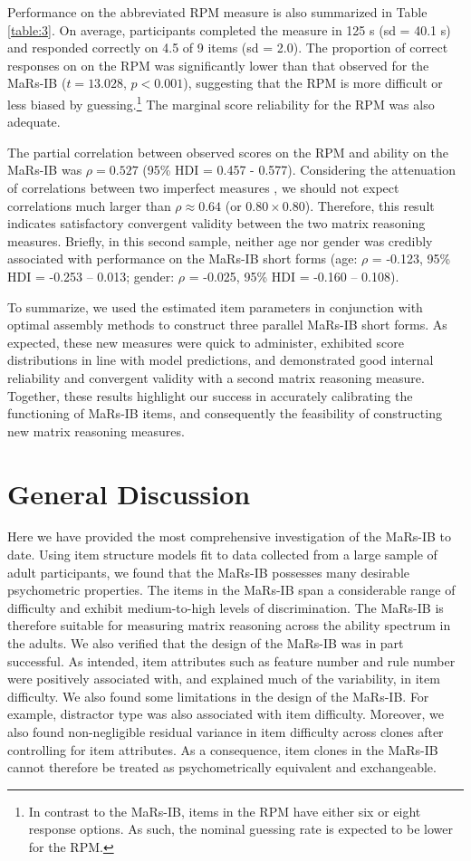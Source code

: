 \documentclass[a4paper,man,natbib]{apa6}
\begin{document}
Performance on the abbreviated RPM measure is also summarized in Table \ref{table:3}. On average, participants completed the measure in 125 s (sd = 40.1 s) and responded correctly on 4.5 of 9 items (sd = 2.0). The proportion of correct responses on on the RPM was significantly lower than that observed for the MaRs-IB ($t = 13.028$, $p < 0.001$), suggesting that the RPM is more difficult or less biased by guessing.\footnote{In contrast to the MaRs-IB, items in the RPM have either six or eight response options. As such, the nominal guessing rate is expected to be lower for the RPM.} The marginal score reliability for the RPM was also adequate.

The partial correlation between observed scores on the RPM and ability on the MaRs-IB was $\rho = 0.527$ (95\% HDI = 0.457 - 0.577). Considering the attenuation of correlations between two imperfect measures \citep{spearman1961proof}, we should not expect correlations much larger than $\rho \approx 0.64$ (or $0.80 \times 0.80$). Therefore, this result indicates satisfactory convergent validity between the two matrix reasoning measures. Briefly, in this second sample, neither age nor gender was credibly associated with performance on the MaRs-IB short forms (age: $\rho$ = -0.123, 95\% HDI = -0.253 -- 0.013; gender: $\rho$ = -0.025, 95\% HDI = -0.160 -- 0.108). 

To summarize, we used the estimated item parameters in conjunction with optimal assembly methods to construct three parallel MaRs-IB short forms. As expected, these new measures were quick to administer, exhibited score distributions in line with model predictions, and demonstrated good internal reliability and convergent validity with a second matrix reasoning measure. Together, these results highlight our success in accurately calibrating the functioning of MaRs-IB items, and consequently the feasibility of constructing new matrix reasoning measures.

\section{General Discussion}

Here we have provided the most comprehensive investigation of the MaRs-IB to date. Using item structure models fit to data collected from a large sample of adult participants, we found that the MaRs-IB possesses many desirable psychometric properties. The items in the MaRs-IB span a considerable range of difficulty and exhibit medium-to-high levels of discrimination. The MaRs-IB is therefore suitable for measuring matrix reasoning across the ability spectrum in the adults. We also verified that the design of the MaRs-IB was in part successful. As intended, item attributes such as feature number and rule number were positively associated with, and explained much of the variability, in item difficulty. We also found some limitations in the design of the MaRs-IB. For example, distractor type was also associated with item difficulty. Moreover, we also found non-negligible residual variance in item difficulty across clones after controlling for item attributes. As a consequence, item clones in the MaRs-IB cannot therefore be treated as psychometrically equivalent and exchangeable. 
\end{document}
